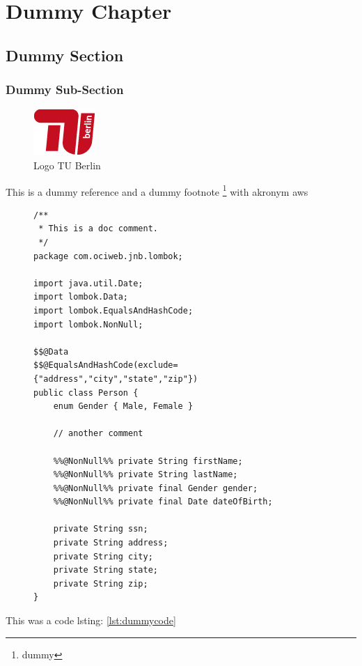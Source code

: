 \chapter{Dummy Chapter}

\section{Dummy Section}

\subsection{Dummy Sub-Section}

\begin{figure}
	\includegraphics[width=\textwidth]{figures/tu_logo.jpg}
	\caption{Logo TU Berlin}
	\label{fig:tu-logo}
\end{figure}

This is a dummy reference \cite{dummy} and a dummy footnote \footnote{dummy} with akronym \ac{aws}


\begin{figure}
\begin{center}
\begin{lstlisting}[label=lst:dummycode, caption=dummycode]
/**
 * This is a doc comment.
 */
package com.ociweb.jnb.lombok;

import java.util.Date;
import lombok.Data;
import lombok.EqualsAndHashCode;
import lombok.NonNull;

$$@Data
$$@EqualsAndHashCode(exclude={"address","city","state","zip"})
public class Person {
    enum Gender { Male, Female }

    // another comment

    %%@NonNull%% private String firstName;
    %%@NonNull%% private String lastName;
    %%@NonNull%% private final Gender gender;
    %%@NonNull%% private final Date dateOfBirth;

    private String ssn;
    private String address;
    private String city;
    private String state;
    private String zip;
}
\end{lstlisting}
\end{center}

\end{figure}

This was a code lsting: \ref{lst:dummycode} 